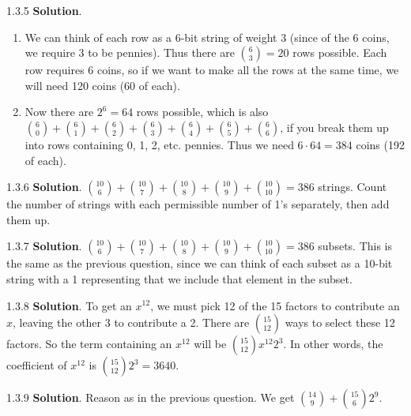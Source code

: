 \documentclass[11pt,]{book}
\theoremstyle{ptxplainnotitle}
\theoremstyle{ptxplaintitle}
\theoremstyle{ptxdefinitionnotitle}
\theoremstyle{ptxdefinitiontitle}
\theoremstyle{ptxdefinitionnotitle}
\theoremstyle{ptxdefinitiontitle}
\theoremstyle{ptxdefinitionnotitle}
\theoremstyle{ptxdefinitiontitle}
\theoremstyle{ptxdefinitiontitlenonumber}
\theoremstyle{ptxdefinitiontitlenonumber}
\numberwithin{equation}{chapter}
\begin{document}
\begin{divisionexercise}{1.3.5}
\textbf{Solution}.\quad%
\hypertarget{p-1422}{}%
\leavevmode%
\begin{enumerate}[label=\alph*.]
\item\hypertarget{li-623}{}\hypertarget{p-1423}{}%
We can think of each row as a 6-bit string of weight 3 (since of the 6 coins, we require 3 to be pennies).  Thus there are \({6 \choose 3} = 20\) rows possible.  Each row requires 6 coins, so if we want to make all the rows at the same time, we will need 120 coins (60 of each).%
\item\hypertarget{li-624}{}\hypertarget{p-1424}{}%
Now there are \(2^6 = 64\) rows possible, which is also \({6 \choose 0} + {6\choose 1} + {6 \choose 2} + {6 \choose 3} + {6 \choose 4} + {6 \choose 5} + {6 \choose 6}\text{,}\) if you break them up into rows containing 0, 1, 2, etc. pennies.  Thus we need \(6 \cdot 64 = 384\) coins (192 of each).%
\end{enumerate}
%
\end{divisionexercise}%
\begin{divisionexercise}{1.3.6}
\textbf{Solution}.\quad%
\hypertarget{p-1430}{}%
\({10 \choose 6} + {10\choose 7} + {10\choose 8} + {10 \choose 9} + {10\choose 10} = 386\) strings.  Count the number of strings with each permissible number of 1's separately, then add them up.%
\end{divisionexercise}%
\begin{divisionexercise}{1.3.7}
\textbf{Solution}.\quad%
\hypertarget{p-1438}{}%
\({10 \choose 6} + {10\choose 7} + {10\choose 8} + {10 \choose 9} + {10\choose 10} = 386\) subsets. This is the same as the previous question, since we can think of each subset as a 10-bit string with a 1 representing that we include that element in the subset.%
\end{divisionexercise}%
\begin{divisionexercise}{1.3.8}
\textbf{Solution}.\quad%
\hypertarget{p-1444}{}%
To get an \(x^{12}\text{,}\) we must pick 12 of the 15 factors to contribute an \(x\text{,}\) leaving the other 3 to contribute a 2. There are \({15 \choose 12}\) ways to select these 12 factors. So the term containing an \(x^{12}\) will be \({15 \choose 12}x^{12}2^{3}\text{.}\) In other words, the coefficient of \(x^{12}\) is \({15\choose 12}2^3 = 3640\text{.}\)%
\end{divisionexercise}%
\begin{divisionexercise}{1.3.9}
\textbf{Solution}.\quad%
\hypertarget{p-1450}{}%
Reason as in the previous question. We get \({14\choose 9} + {15 \choose 6}2^9\text{.}\)%
\end{divisionexercise}%
\end{document}
